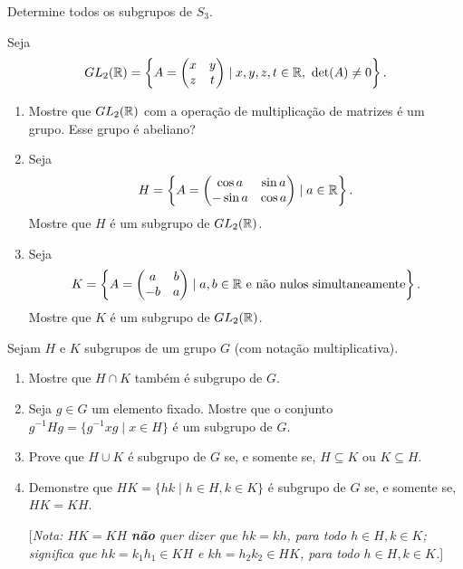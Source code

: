 \documentclass[12pt]{exam}
\begin{document}
    \questao{} Determine todos os subgrupos de $S_3$.

    \vspace{.3cm}

    \questao{} Seja
    \[
      GL_2(\mathbb{R}) = \left\{A = \begin{pmatrix}
          x & y\\z & t
      \end{pmatrix} \mid x, y, z, t \in \mathbb{R},\ \det(A) \ne 0\right\}.
    \]
    \begin{enumerate}[label=({\alph*})]
      \item Mostre que $GL_2(\mathbb{R})$ com a opera\c{c}\~ao de multiplica\c{c}\~ao de matrizes \'e um grupo. Esse grupo \'e abeliano?

      \item Seja
      \[
          H = \left\{ A = \begin{pmatrix}
              \cos a & \sin a\\ -\sin a & \cos a
          \end{pmatrix} \mid a \in \mathbb{R}\right\}.
      \]
      Mostre que $H$ \'e um subgrupo de $GL_2(\mathbb{R})$.

      \item Seja
      \[
          K = \left\{ A = \begin{pmatrix}
              a & b\\ -b & a
          \end{pmatrix} \mid a, b \in \mathbb{R} \mbox{ e n\~ao nulos simultaneamente}\right\}.
      \]
      Mostre que $K$ \'e um subgrupo de $GL_2(\mathbb{R})$.
    \end{enumerate}

    \questao{} Sejam $H$ e $K$ subgrupos de um grupo $G$ (com nota{\c c}{\~a}o
    multiplicativa).
    \begin{enumerate}[label=({\alph*})]
      \item Mostre que $H\cap K$ tamb{\'e}m {\'e} subgrupo de $G$.

      \item Seja $g\in G$ um elemento fixado. Mostre que o conjunto
      $g^{-1}Hg=\{ g^{-1}xg \mid x\in H \} $ {\'e} um subgrupo de $G$.

      \item Prove que $H\cup K$ {\'e} subgrupo de $G$ se, e somente se,
      $H\subseteq K$ ou $K\subseteq H$.

      \item Demonstre que $HK=\{hk \mid h\in H, k\in K\}$ {\'e} subgrupo
      de $G$ se, e somente se, $HK=KH$.

      [\emph{Nota: $HK=KH$ \textbf{n{\~a}o} quer dizer que $hk=kh$,
      para todo $h\in H, k\in K$; significa que $hk=k_1h_1 \in KH$ e $kh=h_2k_2 \in
      HK$, para todo $h\in H, k\in K$.}]
    \end{enumerate}
\end{document}
